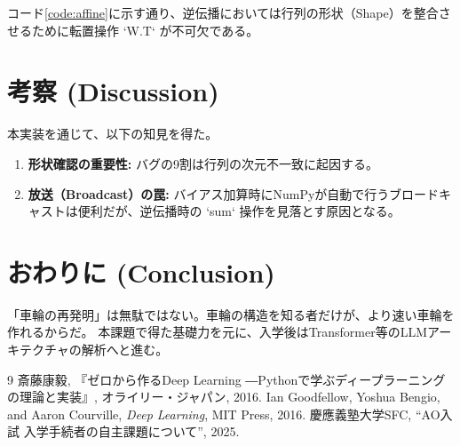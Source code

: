 \documentclass[uplatex, dvipdfmx, a4paper, 11pt]{jsarticle}
\begin{document}
コード\ref{code:affine}に示す通り、逆伝播においては行列の形状（Shape）を整合させるために転置操作 `W.T` が不可欠である。

\section{考察 (Discussion)}
本実装を通じて、以下の知見を得た。
\begin{enumerate}
    \item \textbf{形状確認の重要性:} バグの9割は行列の次元不一致に起因する。
    \item \textbf{放送（Broadcast）の罠:} バイアス加算時にNumPyが自動で行うブロードキャストは便利だが、逆伝播時の `sum` 操作を見落とす原因となる。
\end{enumerate}

\section{おわりに (Conclusion)}
「車輪の再発明」は無駄ではない。車輪の構造を知る者だけが、より速い車輪を作れるからだ。
本課題で得た基礎力を元に、入学後はTransformer等のLLMアーキテクチャの解析へと進む。

\begin{thebibliography}{9}
   斎藤康毅, 『ゼロから作るDeep Learning ―Pythonで学ぶディープラーニングの理論と実装』, オライリー・ジャパン, 2016.
   Ian Goodfellow, Yoshua Bengio, and Aaron Courville, \textit{Deep Learning}, MIT Press, 2016.
   慶應義塾大学SFC, ``AO入試 入学手続者の自主課題について'', 2025.
\end{thebibliography}
\end{document}
